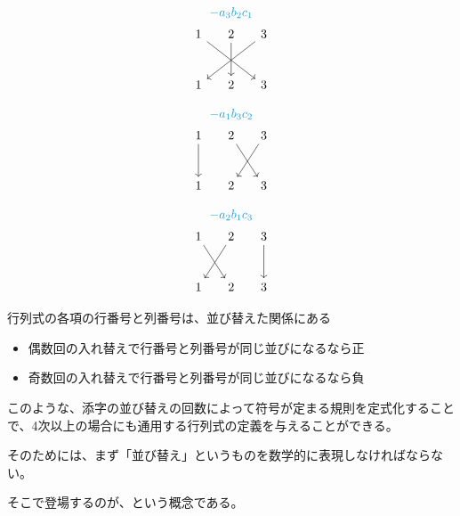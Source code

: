 \documentclass[../../../topic_linear-algebra]{subfiles}
\begin{document}
\begin{tcbraster}[raster columns=3]
\begin{tcolorbox}[empty]
\begin{equation*}
\begin{gathered}
        \textcolor{Cerulean}{-a_3b_2c_1} \\
        \begin{tikzcd}[column sep=3ex, row sep=large]
          1\arrow[rrd] & 2\arrow[d] & 3\arrow[lld] \\
          1 & 2 & 3
        \end{tikzcd}
      \end{gathered}
    \end{equation*}
  \end{tcolorbox}
  \begin{tcolorbox}[empty]
    \begin{equation*}
      \begin{gathered}
        \textcolor{Cerulean}{-a_1b_3c_2} \\
        \begin{tikzcd}[column sep=3ex, row sep=large]
          1\arrow[d] & 2\arrow[rd] & 3\arrow[ld] \\
          1 & 2 & 3
        \end{tikzcd}
      \end{gathered}
    \end{equation*}
  \end{tcolorbox}
  \begin{tcolorbox}[empty]
    \begin{equation*}
      \begin{gathered}
        \textcolor{Cerulean}{-a_2b_1c_3} \\
        \begin{tikzcd}[column sep=3ex, row sep=large]
          1\arrow[rd] & 2\arrow[ld] & 3\arrow[d] \\
          1 & 2 & 3
        \end{tikzcd}
      \end{gathered}
    \end{equation*}
  \end{tcolorbox}
\end{tcbraster}

\begin{emphabox}
  \begin{spacebox}
    行列式の各項の行番号と列番号は、並び替えた関係にある
    \begin{itemize}
      \item 偶数回の入れ替えで行番号と列番号が同じ並びになるなら正
      \item 奇数回の入れ替えで行番号と列番号が同じ並びになるなら負
    \end{itemize}
  \end{spacebox}
\end{emphabox}

\br

このような、添字の並び替えの回数によって符号が定まる規則を定式化することで、4次以上の場合にも通用する行列式の定義を与えることができる。

\br

そのためには、まず「並び替え」というものを数学的に表現しなければならない。

そこで登場するのが、という概念である。
\end{document}
